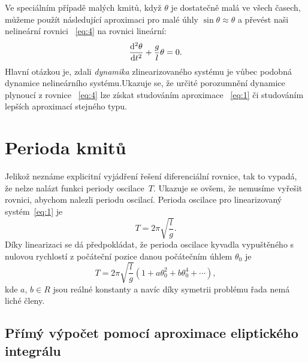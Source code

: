 \documentclass[reqno, a4paper]{amsart}
\begin{document}
Ve speciálním případě malých kmitů, když $\theta$ je dostatečně malá ve všech časech, můžeme použít následující aproximaci pro malé úhly $\sin \theta \approx \theta$ a převést naši nelineární rovnici ~\eqref{eq:4} na rovnici lineární:
\begin{equation}
  \label{eq:1}
  \frac{\mathrm{d}^2 {\theta}}{\mathrm{d} {t}^2} + \frac{g}{l} \theta = 0.
\end{equation}
Hlavní otázkou je, zdali \emph{dynamika} zlinearizovaného systému je vůbec podobná dynamice nelineárního systému.Ukazuje se, že určité porozumnění dynamice plynoucí z rovnice ~\eqref{eq:4} lze získat studováním aproximace ~\eqref{eq:1} či studováním lepších aproximací stejného typu.

\section{Perioda kmitů}
\label{sec:Perioda kmitů}
Jelikož neznáme explicitní vyjádření řešení diferenciální rovnice, tak to vypadá, že nelze nalázt funkci periody oscilace~$T$. Ukazuje se ovšem, že nemusíme vyřešit rovnici, abychom nalezli periodu oscilací. Perioda oscilace pro linearizovaný systém~\eqref{eq:1} je
\begin{equation}
  \label{eq:2}
  T
  =
  2\pi
  \sqrt{
    \frac{l}{g}
  }
  .
\end{equation}
Díky linearizaci se dá předpokládat, že perioda oscilace kyvadla vypuštěného s nulovou rychlostí z počáteční pozice danou počátečním úhlem $\theta_{0}$ je 
\begin{equation}
  \label{eq:3}
  T
  =
  2\pi
  \sqrt{
    \frac{l}{g}
  }
  \left(
    1
    +
    a \theta_{0}^2
    +
    b \theta_{0}^4
    +
    \cdots
  \right)
  ,
\end{equation}
kde $a$, $b \in R$ jsou reálné konstanty a navíc díky symetrii problému řada nemá liché členy.

\subsection{Přímý výpočet pomocí aproximace eliptického integrálu}
\label{Přímý výpočet pomocí aproximace eliptického integrálu}
\end{document}
